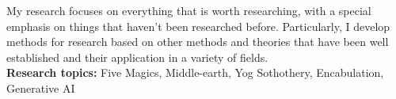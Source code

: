 

My research focuses on everything that is worth researching, with a special
emphasis on things that haven't been researched before. Particularly,
I develop methods for research based on other methods and theories that have
been well established and their application in a variety of fields.
\\[10pt]
\textbf{Research topics:} Five Magics, Middle-earth, Yog Sothothery, Encabulation, Generative AI
\\

